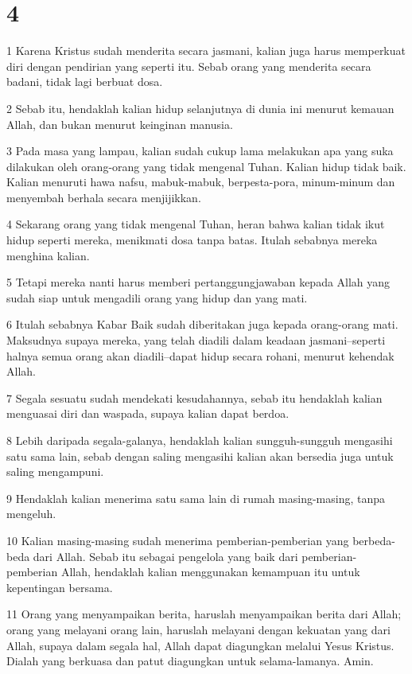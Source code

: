 \chapter{4}

\par 1 Karena Kristus sudah menderita secara jasmani, kalian juga harus memperkuat diri dengan pendirian yang seperti itu. Sebab orang yang menderita secara badani, tidak lagi berbuat dosa.
\par 2 Sebab itu, hendaklah kalian hidup selanjutnya di dunia ini menurut kemauan Allah, dan bukan menurut keinginan manusia.
\par 3 Pada masa yang lampau, kalian sudah cukup lama melakukan apa yang suka dilakukan oleh orang-orang yang tidak mengenal Tuhan. Kalian hidup tidak baik. Kalian menuruti hawa nafsu, mabuk-mabuk, berpesta-pora, minum-minum dan menyembah berhala secara menjijikkan.
\par 4 Sekarang orang yang tidak mengenal Tuhan, heran bahwa kalian tidak ikut hidup seperti mereka, menikmati dosa tanpa batas. Itulah sebabnya mereka menghina kalian.
\par 5 Tetapi mereka nanti harus memberi pertanggungjawaban kepada Allah yang sudah siap untuk mengadili orang yang hidup dan yang mati.
\par 6 Itulah sebabnya Kabar Baik sudah diberitakan juga kepada orang-orang mati. Maksudnya supaya mereka, yang telah diadili dalam keadaan jasmani--seperti halnya semua orang akan diadili--dapat hidup secara rohani, menurut kehendak Allah.
\par 7 Segala sesuatu sudah mendekati kesudahannya, sebab itu hendaklah kalian menguasai diri dan waspada, supaya kalian dapat berdoa.
\par 8 Lebih daripada segala-galanya, hendaklah kalian sungguh-sungguh mengasihi satu sama lain, sebab dengan saling mengasihi kalian akan bersedia juga untuk saling mengampuni.
\par 9 Hendaklah kalian menerima satu sama lain di rumah masing-masing, tanpa mengeluh.
\par 10 Kalian masing-masing sudah menerima pemberian-pemberian yang berbeda-beda dari Allah. Sebab itu sebagai pengelola yang baik dari pemberian-pemberian Allah, hendaklah kalian menggunakan kemampuan itu untuk kepentingan bersama.
\par 11 Orang yang menyampaikan berita, haruslah menyampaikan berita dari Allah; orang yang melayani orang lain, haruslah melayani dengan kekuatan yang dari Allah, supaya dalam segala hal, Allah dapat diagungkan melalui Yesus Kristus. Dialah yang berkuasa dan patut diagungkan untuk selama-lamanya. Amin.
